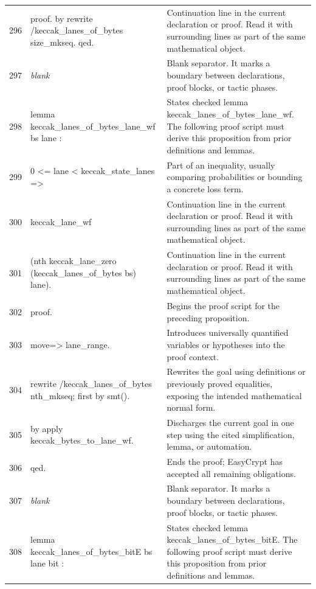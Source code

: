 \documentclass[10pt]{article}
\begin{document}
\begin{longtable}{r L{0.53\textwidth} L{0.37\textwidth}}
296 & {\ttfamily\scriptsize proof. by rewrite /keccak\_lanes\_of\_bytes size\_mkseq. qed.} & Continuation line in the current declaration or proof.  Read it with surrounding lines as part of the same mathematical object. \\
297 & {\ttfamily\scriptsize \emph{blank}} & Blank separator.  It marks a boundary between declarations, proof blocks, or tactic phases. \\
298 & {\ttfamily\scriptsize lemma keccak\_lanes\_of\_bytes\_lane\_wf bs lane :} & States checked lemma keccak\_lanes\_of\_bytes\_lane\_wf.  The following proof script must derive this proposition from prior definitions and lemmas. \\
299 & {\ttfamily\scriptsize   0 <= lane < keccak\_state\_lanes =>} & Part of an inequality, usually comparing probabilities or bounding a concrete loss term. \\
300 & {\ttfamily\scriptsize   keccak\_lane\_wf} & Continuation line in the current declaration or proof.  Read it with surrounding lines as part of the same mathematical object. \\
301 & {\ttfamily\scriptsize     (nth keccak\_lane\_zero (keccak\_lanes\_of\_bytes bs) lane).} & Continuation line in the current declaration or proof.  Read it with surrounding lines as part of the same mathematical object. \\
302 & {\ttfamily\scriptsize proof.} & Begins the proof script for the preceding proposition. \\
303 & {\ttfamily\scriptsize move=> lane\_range.} & Introduces universally quantified variables or hypotheses into the proof context. \\
304 & {\ttfamily\scriptsize rewrite /keccak\_lanes\_of\_bytes nth\_mkseq; first by smt().} & Rewrites the goal using definitions or previously proved equalities, exposing the intended mathematical normal form. \\
305 & {\ttfamily\scriptsize by apply keccak\_bytes\_to\_lane\_wf.} & Discharges the current goal in one step using the cited simplification, lemma, or automation. \\
306 & {\ttfamily\scriptsize qed.} & Ends the proof; EasyCrypt has accepted all remaining obligations. \\
307 & {\ttfamily\scriptsize \emph{blank}} & Blank separator.  It marks a boundary between declarations, proof blocks, or tactic phases. \\
308 & {\ttfamily\scriptsize lemma keccak\_lanes\_of\_bytes\_bitE bs lane bit :} & States checked lemma keccak\_lanes\_of\_bytes\_bitE.  The following proof script must derive this proposition from prior definitions and lemmas. \\

\end{longtable}
\end{document}
